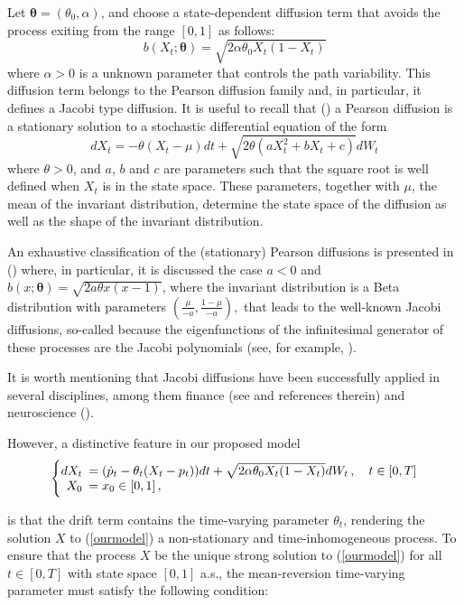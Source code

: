 \documentclass[11pt]{article}
\theoremstyle{definition}
\begin{document}
Let $\bm{\theta} = (\theta_0,\alpha)$, and choose a state-dependent diffusion term that avoids the process exiting from the range $[0,1]$ as follows:
  \begin{equation}
    b (X_t; \bm{\theta} )= \sqrt{2 \alpha \theta_0 X_t (1 - X_t)}
  \end{equation}
  where $\alpha >0$ is a unknown parameter that controls the path variability. This diffusion term belongs to the Pearson diffusion family and, in particular, it defines a Jacobi type diffusion. It is useful to recall that (\cite[440]{foso}) a Pearson diffusion is a stationary solution to a stochastic differential equation of the form
 \begin{equation}
    dX_t = - \theta (X_t - \mu) dt + \sqrt{2 \theta (a X_t^2 + b X_t + c)} dW_t
  \end{equation}
where $\theta>0$, and $a$, $b$ and $c$ are parameters such that the square root is well defined when $X_t$ is in the state space. These parameters, together with $\mu$, the mean of the invariant distribution, determine the state space of the diffusion as well as the shape of the invariant distribution. 

An exhaustive classification of the (stationary) Pearson diffusions is presented in (\cite[440-443]{foso}) where, in particular, it is discussed the case $a < 0$ and $b(x; \bm{\theta}) = \sqrt{2 a \theta x (x-1)}$, where the invariant distribution is a Beta distribution with parameters $\left( \frac{\mu}{-a}, \frac{1 - \mu}{-a} \right),$ that leads to the well-known Jacobi diffusions, so-called because the eigenfunctions of the infinitesimal generator of these processes are the Jacobi polynomials (see, for example, \cite[2860-2861]{leph}). 

It is worth mentioning that Jacobi diffusions have been successfully applied in several disciplines, among them finance (see \cite{vago} and references therein) and neuroscience (\cite{dotala}).

However, a distinctive feature in our proposed model 
\begin{equation}
  \left\{
  \begin{array}{@{}rl@{}}
    dX_t \!\!\!&= (\dot{p}_t  - \theta_t (X_t - p_t) ) dt +\sqrt{2 \alpha \theta_0 X_t (1 - X_t)} dW_t\,, \quad t \in [0,T]  \\
   X_0  \!\!\!&=  x_0\in [0,1] \,,
 \end{array}\right.  \label{ourmodel}
\end{equation}

is that the drift term contains the time-varying parameter $\theta_t$, rendering the solution $X$ to (\ref{ourmodel}) a non-stationary and time-inhomogeneous process. To ensure that the process $X$ be the unique strong solution to (\ref{ourmodel}) for all $t \in [0,T]$ with state space $[0,1]$ a.s., the mean-reversion time-varying parameter must satisfy the following condition:
\end{document}
